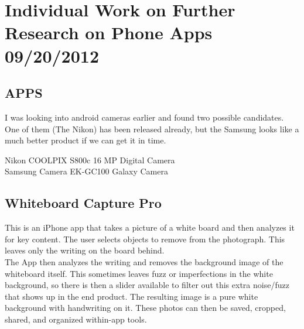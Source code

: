 \documentclass[]{article}
\begin{document}
	\tableofcontents
	\newpage
	
	
	\section{Individual Work on Further Research on Phone Apps 09/20/2012}
	
	
		\subsection{APPS}
		I was looking into android cameras earlier and found two possible candidates. One of them (The Nikon) has been released already, but the Samsung looks like a much better product if we can get it in time.
		
		Nikon COOLPIX S800c 16 MP Digital Camera\\
		Samsung Camera EK-GC100 Galaxy Camera\\
	
			
		\subsection{Whiteboard Capture Pro}
		
			This is an iPhone app that takes a picture of a white board and then analyzes it for key content. The user selects objects to remove from the photograph. This leaves only the writing on the board behind.\\
			
			The App then analyzes the writing and removes the background image of the whiteboard itself. This sometimes leaves fuzz or imperfections in the white background, so there is then a slider available to filter out this extra noise/fuzz that shows up in the end product. The resulting image is a pure white background with handwriting on it. These photos can then be saved, cropped, shared, and organized within-app tools.\\
			
\end{document}
